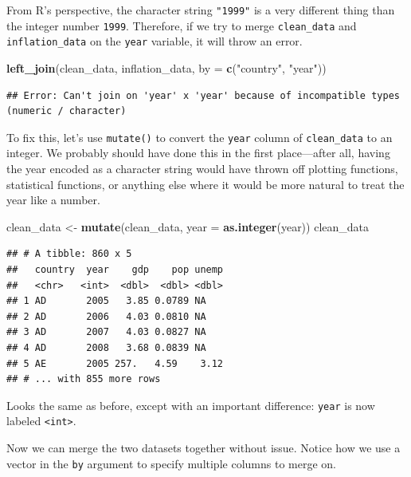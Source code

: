\documentclass[12pt,oneside,openany]{book}
\newenvironment{Shaded}{\begin{snugshade}}{\end{snugshade}}
\newcommand{\KeywordTok}[1]{\textcolor[rgb]{0.13,0.29,0.53}{\textbf{#1}}}
\newcommand{\DataTypeTok}[1]{\textcolor[rgb]{0.13,0.29,0.53}{#1}}
\newcommand{\StringTok}[1]{\textcolor[rgb]{0.31,0.60,0.02}{#1}}
\newcommand{\NormalTok}[1]{#1}
\begin{document}
From R's perspective, the character string \texttt{"1999"} is a very
different thing than the integer number \texttt{1999}. Therefore, if we
try to merge \texttt{clean\_data} and \texttt{inflation\_data} on the
\texttt{year} variable, it will throw an error.

\begin{Shaded}
\begin{Highlighting}[]
\KeywordTok{left_join}\NormalTok{(clean_data,}
\NormalTok{          inflation_data,}
          \DataTypeTok{by =} \KeywordTok{c}\NormalTok{(}\StringTok{"country"}\NormalTok{, }\StringTok{"year"}\NormalTok{))}
\end{Highlighting}
\end{Shaded}

\begin{verbatim}
## Error: Can't join on 'year' x 'year' because of incompatible types (numeric / character)
\end{verbatim}

To fix this, let's use \texttt{mutate()} to convert the \texttt{year}
column of \texttt{clean\_data} to an integer. We probably should have
done this in the first place---after all, having the year encoded as a
character string would have thrown off plotting functions, statistical
functions, or anything else where it would be more natural to treat the
year like a number.

\begin{Shaded}
\begin{Highlighting}[]
\NormalTok{clean_data <-}\StringTok{ }\KeywordTok{mutate}\NormalTok{(clean_data,}
                     \DataTypeTok{year =} \KeywordTok{as.integer}\NormalTok{(year))}
\NormalTok{clean_data}
\end{Highlighting}
\end{Shaded}

\begin{verbatim}
## # A tibble: 860 x 5
##   country  year    gdp    pop unemp
##   <chr>   <int>  <dbl>  <dbl> <dbl>
## 1 AD       2005   3.85 0.0789 NA   
## 2 AD       2006   4.03 0.0810 NA   
## 3 AD       2007   4.03 0.0827 NA   
## 4 AD       2008   3.68 0.0839 NA   
## 5 AE       2005 257.   4.59    3.12
## # ... with 855 more rows
\end{verbatim}

Looks the same as before, except with an important difference:
\texttt{year} is now labeled \texttt{\textless{}int\textgreater{}}.

Now we can merge the two datasets together without issue. Notice how we
use a vector in the \texttt{by} argument to specify multiple columns to
merge on.
\end{document}
